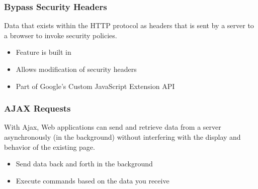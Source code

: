 \documentclass[aspectratio=169]{beamer}
\begin{document}
\begin{frame}
  \frametitle{Bypass Security Headers}
  \begin{center}
      \begin{tcolorbox}[title=Security Header Definition,colback=gray]
        Data that exists within the HTTP protocol as headers that is sent by a server to a browser to invoke security policies.
      \end{tcolorbox}
      \begin{itemize}
      \item Feature is built in
      \item Allows modification of security headers
      \item Part of Google's Custom JavaScript Extension API
      \end{itemize}
  \end{center}
\end{frame}

\begin{frame}
  \frametitle{AJAX Requests}
  \begin{center}
    \begin{tcolorbox}[title=\href{https://en.wikipedia.org/wiki/Ajax_(programming)}{AJAX Definition},colback=gray]
      With Ajax, Web applications can send and retrieve data from a server asynchronously (in the background) without interfering with the display and behavior of the existing page.
    \end{tcolorbox}
    \begin{itemize}
    \item Send data back and forth in the background
    \item Execute commands based on the data you receive
    \end{itemize}
  \end{center}
\end{frame}
\end{document}
